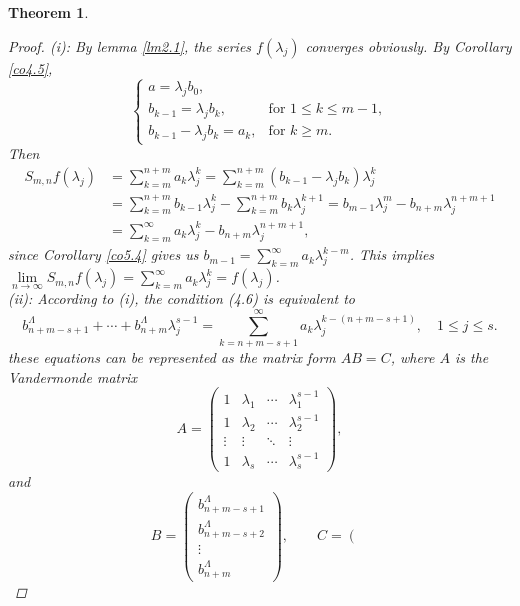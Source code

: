 \documentclass[12pt,reqno]{amsart}
\newtheorem{theorem}{Theorem}[section]
\begin{document}
\begin{theorem}
\begin{proof}
(i): By lemma \ref{lm2.1}, the series $f({\lambda_j})$  converges obviously. By Corollary \ref{co4.5},
 \[
 \begin{cases}
 a = {\lambda _j} b_0, \\
 b_{k - 1} = {\lambda _j} b_k, & \text{for } 1 \le k \le m - 1, \\
 b_{k - 1} - {\lambda _j} b_k = a_k, & \text{for } k \ge m.
 \end{cases}
 \]
 Then
 \begin{align*}
 {S_{m,n}}f({\lambda _j}) &= \sum\limits_{k = m}^{n + m} {{a_k}\lambda _j^k} =\sum\limits_{k = m}^{n + m} {({b_{k - 1}} - {\lambda _j} {b_k})\lambda _j^k} \\
                        &= \sum\limits_{k = m}^{n + m} {{b_{k - 1}}\lambda _j^k}  - \sum\limits_{k = m}^{n + m} {{b_k}\lambda _j^{k + 1}} = {b_{m - 1}}\lambda _j^m - {b_{n + m}}\lambda _j^{n + m + 1}\\
                        &= \sum\limits_{k = m}^{\infty} {{a_k}\lambda _j^k}  - b_{n + m} {\lambda _j^{n + m + 1}},
 \end{align*}
 since Corollary \ref{co5.4} gives us ${b_{m - 1}} = \sum\limits_{k = m}^\infty  {{a_k}\lambda _j^{k - m}} $. This implies $\mathop {\lim }\limits_{n \to \infty } {S_{m,n}}f({\lambda _j}) = \sum\limits_{k = m}^\infty  {{a_k}\lambda _j^k}  = f({\lambda _j})$.\\
 (ii): According to (i), the condition (4.6) is equivalent to
 \[b_{n + m - s + 1}^\Lambda  +  \cdots  + b_{n + m}^\Lambda \lambda _j^{s - 1} = \sum\limits_{{k} = n + m - s + 1}^\infty  {{a_k}\lambda _j^{k - (n + m - s + 1)}} ,\quad 1 \le j \le s.\]
 these equations can be represented as the matrix form $AB = C$, where $A$ is the Vandermonde matrix
 \[
 A = \begin{pmatrix}
 1 & \lambda_1 & \cdots & \lambda_1^{s-1} \\
 1 & \lambda_2 & \cdots & \lambda_2^{s-1} \\
 \vdots & \vdots & \ddots & \vdots \\
 1 & \lambda_s & \cdots & \lambda_s^{s-1}
 \end{pmatrix},
 \]
 and
 \[B = \left( {\begin{array}{*{20}{c}}
 {b_{n + m - s + 1}^\Lambda }\\
 {b_{n + m - s + 2}^\Lambda }\\
 \vdots \\
 {b_{n + m}^\Lambda }
 \end{array}} \right),\quad \quad C = \left( {\begin{array}{*{20}{c}}

\end{array}}\]
\end{proof}
\end{theorem}
\end{document}
